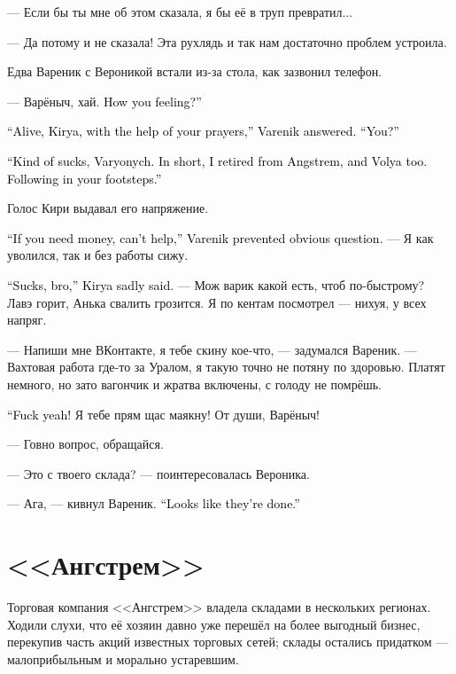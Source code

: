 \documentclass[a4paper,10pt,fleqn]{book}\usepackage{polyglossia}\setdefaultlanguage{english}\setotherlanguage{russian}\defaultfontfeatures{Ligatures=TeX,Mapping=tex-text} \usepackage{xcolor}\definecolor{lightgray}{HTML}{bbbbbb}\color{lightgray}\newcommand{\ml}[3]{\textcolor{black}{#3}}
\newcommand{\asterism}{\vspace{1em}{\centering\Large\bfseries$\ast~\ast~\ast$\par}\vspace{1em}}
\begin{document}
--- Если бы ты мне об этом сказала, я бы её в труп превратил...

--- Да потому и не сказала!
Эта рухлядь и так нам достаточно проблем устроила.

\asterism

Едва Вареник с Вероникой встали из-за стола, как зазвонил телефон.

--- Варёныч, хай.
\ml{$0$}
{Как здравие?}
{How you feeling?''}

\ml{$0$}
{--- Жив, Киря, твоими молитвами, --- лаконично ответил Вареник.}
{``Alive, Kirya, with the help of your prayers,'' Varenik answered.}
\ml{$0$}
{--- Сам как?}
{``You?''}

\ml{$0$}
{--- Да как-то вот, Варёныч.}
{``Kind of sucks, Varyonych.}
\ml{$0$}
{Короче, ушёл я из <<Ангстрема>>, и Воля ушёл.}
{In short, I retired from Angstrem, and Volya too.}
\ml{$0$}
{По твоим стопам.}
{Following in your footsteps.''}

Голос Кири выдавал его напряжение.

\ml{$0$}
{--- Если ты хочешь занять, не могу помочь, --- предупредил Вареник очевидный вопрос.}
{``If you need money, can't help,'' Varenik prevented obvious question.}
--- Я как уволился, так и без работы сижу.

\ml{$0$}
{--- Бля, братан, --- опечалился Киря.}
{``Sucks, bro,'' Kirya sadly said.}
--- Мож варик какой есть, чтоб по-быстрому?
Лавэ горит, Анька свалить грозится.
Я по кентам посмотрел --- нихуя, у всех напряг.

--- Напиши мне ВКонтакте, я тебе скину кое-что, --- задумался Вареник.
--- Вахтовая работа где-то за Уралом, я такую точно не потяну по здоровью.
Платят немного, но зато вагончик и жратва включены, с голоду не помрёшь.

\ml{$0$}
{--- Заебись!}
{``Fuck yeah!}
Я тебе прям щас маякну!
От души, Варёныч!

--- Говно вопрос, обращайся.

--- Это с твоего склада? --- поинтересовалась Вероника.

--- Ага, --- кивнул Вареник.
\ml{$0$}
{--- Там походу всё.}
{``Looks like they're done.''}

\section{<<Ангстрем>>}

Торговая компания <<Ангстрем>> владела складами в нескольких регионах.
Ходили слухи, что её хозяин давно уже перешёл на более выгодный бизнес, перекупив часть акций известных торговых сетей;
склады остались придатком --- малоприбыльным и морально устаревшим.
\end{document}
